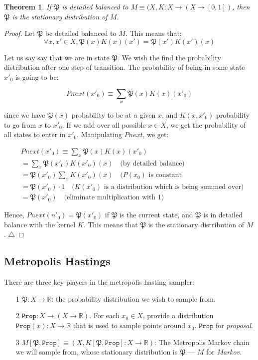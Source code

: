 \documentclass[titlepage]{article}
\newcommand{\R}{\mathbb{R}}
\renewcommand{\P}{\mathfrak{P}}
\newcommand{\Prop}{\texttt{Prop}}
\newcommand{\qed}{\ensuremath{\triangle}}
\newtheorem{theorem}{Theorem}
\newtheorem{proof}{Proof}[theorem]
\begin{document}
\begin{theorem}
If $\P$ is detailed balanced to $M \equiv (X, K: X \rightarrow (X \rightarrow [0, 1])$,
then $\P$ is the stationary distribution of $M$.
\end{theorem}
\begin{proof}
Let $\P$ be detailed balanced to $M$. This means that:
$$
\forall x, x' \in X, \P(x) K(x)(x') = \P(x') K(x')(x)
$$

Let us say say that we are in state $\P$. We wish the find the probability
distribution after one step of transition. The probability of being
in some state $x'_0$ is going to be:

$$
Pnext(x'_0) \equiv \sum_x \P(x) K(x)(x'_0)
$$

since we have $\P(x)$ probability to be at a given $x$, and
$K(x, x'_0)$  probability to go from $x$ to $x'_0$. If we add over all possible
$x \in X$, we get the probability of all states to enter in $x'_0$.
Manipulating $Pnext$, we get:

\begin{align*}
&Pnext(x'_0) \equiv \sum_x \P(x) K(x)(x'_0) \\
&= \sum_x \P(x'_0) K(x'_0)(x) \quad \text{(by detailed balance)} \\
&= \P(x'_0) \sum_x K(x'_0)(x) \quad \text{($P(x_0)$ is constant} \\
&= \P(x'_0) \cdot 1 \quad \text{($K(x'_0)$ is a distribution which is being summed over)} \\
&= \P(x'_0) \quad \text{(eliminate multiplication with 1)}
\end{align*}

Hence, $Pnext(n'_0) = \P(x'_0)$ if $\P$ is the current state, and $\P$
is in detailed balance with the kernel $K$.
This means that $\P$ is the stationary distribution of $M$.
\qed
\end{proof}

\subsection{Metropolis Hastings}

There are three key players in the metropolis hasting sampler:
\begin{itemize}
    \item [1] $\P: X \rightarrow \R$: the probability distribution we wish to sample from.
    \item[2] $\Prop: X \rightarrow (X \rightarrow \R)$. For each $x_0 \in X$,
        provide a distribution $\Prop(x): X \rightarrow \R$ that is used to
        sample points around $x_0$.  $\Prop$ for \emph{proposal}.
    \item [3] $M[\P, \Prop] \equiv (X, K[\P, \Prop]: X \rightarrow \R)$: The
        Metropolis Markov chain we will sample from, whose stationary distribution is $\P$ ---
        $M$ for \emph{Markov}.
\end{itemize}
\end{document}
